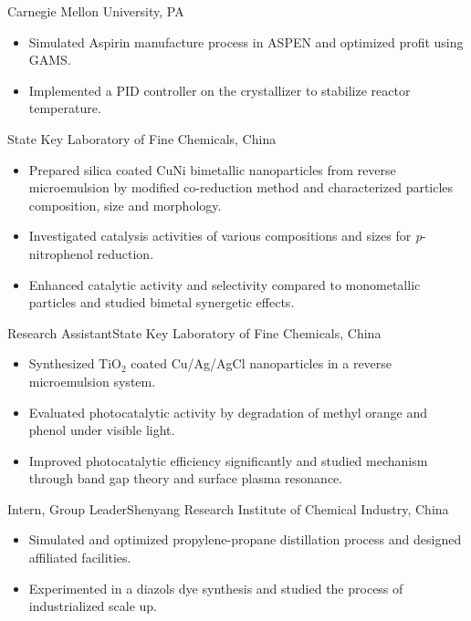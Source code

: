 \documentclass[a4paper,11pt]{article}
\begin{document}
 {Carnegie Mellon University, PA}{}{
\begin{itemize}
\item Simulated Aspirin manufacture process in ASPEN and optimized profit using GAMS.
\item Implemented a PID controller on the crystallizer to stabilize reactor temperature.
\end{itemize}
}

 {State Key Laboratory of Fine Chemicals, China}{}{
\begin{itemize}
\item Prepared silica coated CuNi bimetallic nanoparticles from reverse microemulsion by modified co-reduction method and characterized particles composition, size and morphology.
\item Investigated catalysis activities of various compositions and sizes for \textit{p}-nitrophenol reduction.
\item Enhanced catalytic activity and selectivity compared to monometallic particles and studied bimetal synergetic effects.
\end{itemize}
}


 {Research Assistant}{State Key Laboratory of Fine Chemicals, China}{}{
\begin{itemize}
\item Synthesized TiO$_2$ coated Cu/Ag/AgCl nanoparticles in a reverse microemulsion system.
\item Evaluated photocatalytic activity by degradation of methyl orange and phenol under visible light.
\item Improved photocatalytic efficiency significantly and studied mechanism through band gap theory and surface plasma resonance.
\end{itemize}
}


 {Intern, Group Leader}{Shenyang Research Institute of Chemical Industry, China}{}{
\begin{itemize}
\item Simulated and optimized propylene-propane distillation process and designed affiliated facilities.
\item Experimented in a diazols dye synthesis and studied the process of industrialized scale up.
\end{itemize}
}
\end{document}
